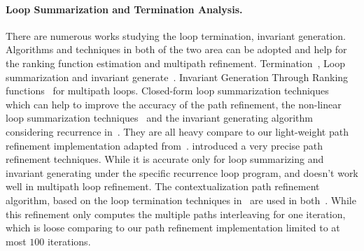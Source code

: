 \paragraph{Loop Summarization and Termination Analysis.}
There are numerous works studying the loop termination, invariant generation. Algorithms and techniques in both of the two area can be adopted and help for the ranking function estimation and multipath refinement.
Termination~\cite{FalkeKS12, FalkeKS11},
Loop summarization and invariant generate~\cite{HumenbergerJK18}.
Invariant Generation Through Ranking functions~\cite{AliasDFG10} for multipath loops.
Closed-form loop summarization techniques~\cite{KincaidBCR19} which can help to improve the accuracy of the path refinement, the non-linear loop summarization techniques~\cite{KincaidCBR18} and the invariant generating algorithm considering recurrence in~\cite{BreckCKR20}. They are all heavy compare to our light-weight path refinement implementation adapted from~\cite{GulwaniJK09}.
\cite{CyphertBKR19} introduced a very precise path refinement techniques. While it is accurate only for loop summarizing and invariant generating under the specific recurrence loop program, and doesn't work well in multipath loop refinement.
The contextualization path refinement algorithm, based on the loop termination techniques in~\cite{ManoliosV06} are used in both~\cite{ZulegerGSV11, SinnZV14}. While this refinement only computes the multiple paths interleaving for one iteration, which is loose comparing to our path refinement implementation limited to at most $100$ iterations.
